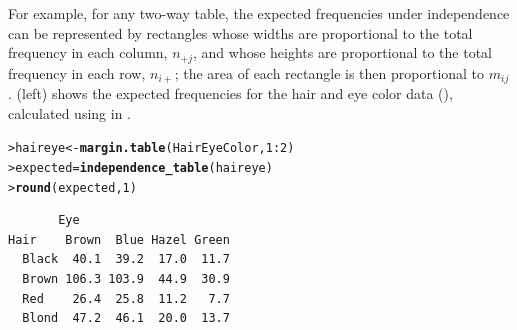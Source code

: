 \documentclass[10pt,krantz2]{krantz}\usepackage[]{graphicx}\usepackage[]{color}
\makeatletter
\newcommand{\hlnum}[1]{\textcolor[rgb]{0.686,0.059,0.569}{#1}}%
\newcommand{\hlopt}[1]{\textcolor[rgb]{0,0,0}{#1}}%
\newcommand{\hlstd}[1]{\textcolor[rgb]{0.345,0.345,0.345}{#1}}%
\newcommand{\hlkwb}[1]{\textcolor[rgb]{0.69,0.353,0.396}{#1}}%
\newcommand{\hlkwd}[1]{\textcolor[rgb]{0.737,0.353,0.396}{\textbf{#1}}}%
\newenvironment{kframe}{%
 \def\at@end@of@kframe{}%
 \ifinner\ifhmode%
  \def\at@end@of@kframe{\end{minipage}}%
  \begin{minipage}{\columnwidth}%
 \fi\fi%
 \def\FrameCommand##1{\hskip\@totalleftmargin \hskip-\fboxsep
 \colorbox{shadecolor}{##1}\hskip-\fboxsep
     \hskip-\linewidth \hskip-\@totalleftmargin \hskip\columnwidth}%
 \MakeFramed {\advance\hsize-\width
   \@totalleftmargin\z@ \linewidth\hsize
   \@setminipage}}%
 {\par\unskip\endMakeFramed%
 \at@end@of@kframe}
\newenvironment{knitrout}{}{} %
\renewenvironment{knitrout}{\small\renewcommand{\baselinestretch}{.85}}{} %
\makeatother
\begin{document}
For example, for any two-way table, the expected frequencies under independence
can be represented by rectangles whose widths are proportional to the
total frequency in each column, \(n_{+j}\), and whose heights are
proportional to the total frequency in each row, \(n_{i+}\); the area
of each rectangle is then proportional to \(m_{ij}\).  (left)
shows the expected frequencies for the hair and eye color
data (), calculated using
 in .
\begin{knitrout}
\color{fgcolor}\begin{kframe}
\begin{alltt}
\hlstd{> }\hlstd{haireye} \hlkwb{<-} \hlkwd{margin.table}\hlstd{(HairEyeColor,} \hlnum{1}\hlopt{:}\hlnum{2}\hlstd{)}
\hlstd{> }\hlstd{expected} \hlkwb{=} \hlkwd{independence_table}\hlstd{(haireye)}
\hlstd{> }\hlkwd{round}\hlstd{(expected,} \hlnum{1}\hlstd{)}
\end{alltt}
\begin{verbatim}
       Eye
Hair    Brown  Blue Hazel Green
  Black  40.1  39.2  17.0  11.7
  Brown 106.3 103.9  44.9  30.9
  Red    26.4  25.8  11.2   7.7
  Blond  47.2  46.1  20.0  13.7
\end{verbatim}
\end{kframe}
\end{knitrout}
\end{document}

